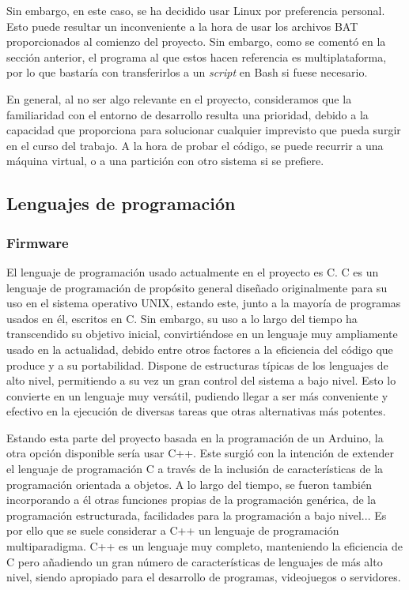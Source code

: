 Sin embargo, en este caso, se ha decidido usar Linux por preferencia personal. Esto puede resultar un inconveniente a la hora de usar los archivos BAT proporcionados al comienzo del proyecto. Sin embargo, como se comentó en la sección anterior, el programa al que estos hacen referencia es multiplataforma, por lo que bastaría con transferirlos a un \textit{script} en Bash si fuese necesario.

En general, al no ser algo relevante en el proyecto, consideramos que la familiaridad con el entorno de desarrollo resulta una prioridad, debido a la capacidad que proporciona para solucionar cualquier imprevisto que pueda surgir en el curso del trabajo. A la hora de probar el código, se puede recurrir a una máquina virtual, o a una partición con otro sistema si se prefiere.

\subsection{Lenguajes de programación}

\subsubsection{Firmware}

El lenguaje de programación usado actualmente en el proyecto es C. C es un lenguaje de programación de propósito general diseñado originalmente para su uso en el sistema operativo UNIX, estando este, junto a la mayoría de programas usados en él, escritos en C. Sin embargo, su uso a lo largo del tiempo ha transcendido su objetivo inicial, convirtiéndose en un lenguaje muy ampliamente usado en la actualidad, debido entre otros factores a la eficiencia del código que produce y a su portabilidad. Dispone de estructuras típicas de los lenguajes de alto nivel, permitiendo a su vez un gran control del sistema a bajo nivel. Esto lo convierte en un lenguaje muy versátil, pudiendo llegar a ser más conveniente y efectivo en la ejecución de diversas tareas que otras alternativas más potentes. \cite{k&r}

Estando esta parte del proyecto basada en la programación de un Arduino, la otra opción disponible sería usar C++. Este surgió con la intención de extender el lenguaje de programación C a través de la inclusión de características de la programación orientada a objetos. A lo largo del tiempo, se fueron también incorporando a él otras funciones propias de la programación genérica, de la programación estructurada, facilidades para la programación a bajo nivel... Es por ello que se suele considerar a C++ un lenguaje de programación multiparadigma. C++ es un lenguaje muy completo, manteniendo la eficiencia de C pero añadiendo un gran número de características de lenguajes de más alto nivel, siendo apropiado para el desarrollo de programas, videojuegos o servidores.

